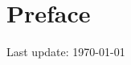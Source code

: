 \documentclass[11pt,oneside,openany]{memoir}
\begin{document}
\chapter*{Preface}
\vspace{-35pt}


\vspace{-35pt}
\tableofcontents
\vfill
\specialdate
Last update: \today

%


\begin{appendices}


\end{appendices}
\end{document}

